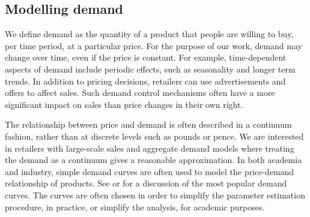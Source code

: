 \documentclass[main.tex]{subfiles}
\begin{document}
\subsection{Modelling demand}\label{sec:intro_model_demand}
We define demand as the quantity of a product that people are willing
to buy, per time period, at a particular price. For the purpose of our
work, demand may change over time, even if the price is constant.
For example, time-dependent aspects of demand include periodic effects, such as
seasonality and longer term trends.
In addition to pricing decisions, retailers can use advertisements and
offers to affect sales. Such demand control mechanisms often have a
more significant impact on sales than price changes in their own
right. %

The relationship between price and demand is often described in a
continuum fashion, rather than at discrete levels such as pounds or
pence. We are interested in retailers with large-scale sales and
aggregate demand models where treating the demand as a continuum gives
a reasonable approximation.
In both academia and industry, simple demand curves are often used to
model the price-demand relationship of
products. See \citet[Ch.~7.3]{talluri2006theory} or \citet{phillips2005pricing}
for a discussion of the most popular demand curves. The curves are often
chosen in order to simplify the parameter
estimation procedure, in practice, or simplify the analysis, for academic purposes.
\end{document}

